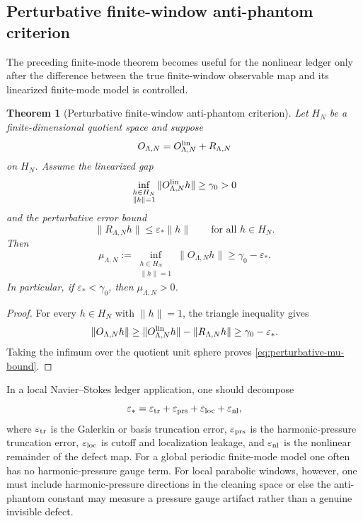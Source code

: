 \documentclass[11pt]{article}
\numberwithin{equation}{section}
\newtheorem{theorem}{Theorem}[section]
\newcommand{\eps}{\varepsilon}
\begin{document}
\subsection{Perturbative finite-window anti-phantom criterion}

The preceding finite-mode theorem becomes useful for the nonlinear ledger only after the difference between the true finite-window observable map and its linearized finite-mode model is controlled.

\begin{theorem}[Perturbative finite-window anti-phantom criterion]\label{thm:perturbative-antiphantom}
Let $H_N$ be a finite-dimensional quotient space and suppose
\[
    O_{\Lambda,N}=O^{\rm lin}_{\Lambda,N}+R_{\Lambda,N}
\]
on $H_N$.  Assume the linearized gap
\[
    \inf_{\substack{h\in H_N\\ \|h\|=1}}
    \|O^{\rm lin}_{\Lambda,N}h\|
    \ge
    \gamma_0>0
\]
and the perturbative error bound
\begin{equation}\label{eq:perturbative-error-bound}
    \|R_{\Lambda,N}h\|
    \le
    \eps_*
    \|h\|
    \qquad
    \text{for all }h\in H_N.
\end{equation}
Then
\begin{equation}\label{eq:perturbative-mu-bound}
    \mu_{\Lambda,N}
    :=
    \inf_{\substack{h\in H_N\\ \|h\|=1}}
    \|O_{\Lambda,N}h\|
    \ge
    \gamma_0-\eps_*.
\end{equation}
In particular, if $\eps_*<\gamma_0$, then $\mu_{\Lambda,N}>0$.
\end{theorem}

\begin{proof}
For every $h\in H_N$ with $\|h\|=1$, the triangle inequality gives
\[
    \|O_{\Lambda,N}h\|
    \ge
    \|O^{\rm lin}_{\Lambda,N}h\|-
    \|R_{\Lambda,N}h\|
    \ge
    \gamma_0-\eps_*.
\]
Taking the infimum over the quotient unit sphere proves \eqref{eq:perturbative-mu-bound}.
\end{proof}

In a local Navier--Stokes ledger application, one should decompose
\begin{equation}\label{eq:error-budget}
    \eps_*
    =
    \eps_{\rm tr}
    +
    \eps_{\rm prs}
    +
    \eps_{\rm loc}
    +
    \eps_{\rm nl},
\end{equation}
where $\eps_{\rm tr}$ is the Galerkin or basis truncation error, $\eps_{\rm prs}$ is the harmonic-pressure truncation error, $\eps_{\rm loc}$ is cutoff and localization leakage, and $\eps_{\rm nl}$ is the nonlinear remainder of the defect map.  For a global periodic finite-mode model one often has no harmonic-pressure gauge term.  For local parabolic windows, however, one must include harmonic-pressure directions in the cleaning space or else the anti-phantom constant may measure a pressure gauge artifact rather than a genuine invisible defect.
\end{document}

